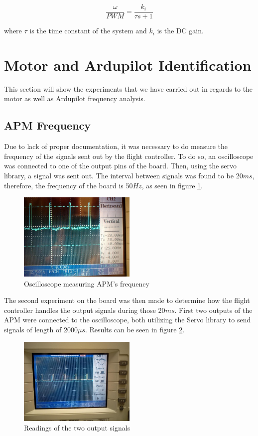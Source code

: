 \begin{equation}
   \frac{\omega}{PWM}=\frac{k_{i}}{\tau s+1}
\end{equation}


where $\tau$ is the time constant of the system and $k_{i}$ is the DC gain. 

\section{Motor and Ardupilot Identification}
This section will show the experiments that we have carried out in regards to the motor as well as Ardupilot frequency analysis.

\subsection{APM Frequency}
Due to lack of proper documentation, it was necessary to do measure the frequency of the signals sent out by the flight controller. To do so, an oscilloscope was connected to one of the output pins of the board. Then, using the servo library, a signal was sent out. The interval between signals was found to be 20$ms$, therefore, the frequency of the board is 50$Hz$, as seen in figure \ref{oscillo1}.
\begin{figure}[H]
  \centering
    \includegraphics[width=0.5\textwidth]{images/oscillo1.jpg}
	\caption{Oscilloscope measuring APM's frequency}
	\label{oscillo1}
\end{figure}

The second experiment on the board was then made to determine how the flight controller handles the output signals during those 20$ms$. First two outputs of the APM were connected to the oscilloscope, both utilizing the Servo library to send signals of length of 2000$\mu s$. Results can be seen in figure \ref{oscillo2}.
\begin{figure}[H]
  \centering
    \includegraphics[width=0.5\textwidth]{images/oscillo2.jpg}
	\caption{Readings of the two output signals}
	\label{oscillo2}
\end{figure}

